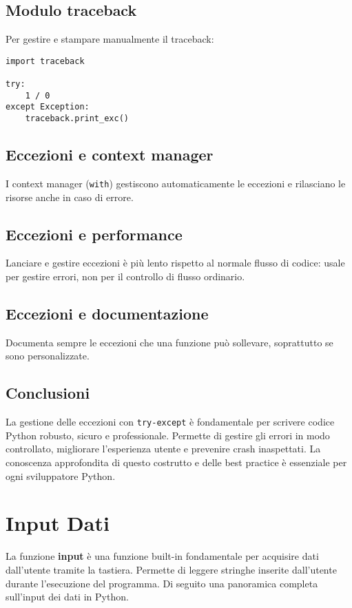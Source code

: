 \documentclass[a4paper,12pt]{article}
\begin{document}
\subsection*{Modulo traceback}
Per gestire e stampare manualmente il traceback:
\begin{lstlisting}
import traceback

try:
    1 / 0
except Exception:
    traceback.print_exc()
\end{lstlisting}

\subsection*{Eccezioni e context manager}
I context manager (\texttt{with}) gestiscono automaticamente le eccezioni e rilasciano le risorse anche in caso di errore.

\subsection*{Eccezioni e performance}
Lanciare e gestire eccezioni è più lento rispetto al normale flusso di codice: usale per gestire errori, non per il controllo di flusso ordinario.

\subsection*{Eccezioni e documentazione}
Documenta sempre le eccezioni che una funzione può sollevare, soprattutto se sono personalizzate.

\subsection*{Conclusioni}
La gestione delle eccezioni con \texttt{try-except} è fondamentale per scrivere codice Python robusto, sicuro e professionale. Permette di gestire gli errori in modo controllato, migliorare l'esperienza utente e prevenire crash inaspettati. La conoscenza approfondita di questo costrutto e delle best practice è essenziale per ogni sviluppatore Python.

\section{Input Dati}
La funzione \textbf{input} è una funzione built-in fondamentale per acquisire dati dall'utente tramite la tastiera. Permette di leggere stringhe inserite dall'utente durante l'esecuzione del programma. Di seguito una panoramica completa sull'input dei dati in Python.
\end{document}
